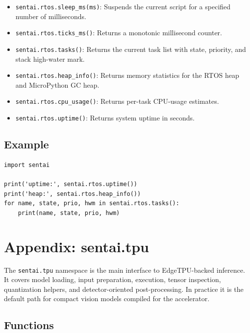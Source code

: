 \begin{itemize}
\tightlist
\item
  \texttt{sentai.rtos.sleep\_ms(ms)}: Suspends the current script for a
  specified number of milliseconds.
\item
  \texttt{sentai.rtos.ticks\_ms()}: Returns a monotonic millisecond
  counter.
\item
  \texttt{sentai.rtos.tasks()}: Returns the current task list with
  state, priority, and stack high-water mark.
\item
  \texttt{sentai.rtos.heap\_info()}: Returns memory statistics for the
  RTOS heap and MicroPython GC heap.
\item
  \texttt{sentai.rtos.cpu\_usage()}: Returns per-task CPU-usage
  estimates.
\item
  \texttt{sentai.rtos.uptime()}: Returns system uptime in seconds.
\end{itemize}

\subsection{Example}\label{example-1}

\begin{verbatim}
import sentai

print('uptime:', sentai.rtos.uptime())
print('heap:', sentai.rtos.heap_info())
for name, state, prio, hwm in sentai.rtos.tasks():
    print(name, state, prio, hwm)
\end{verbatim}

\section{Appendix: sentai.tpu}\label{appendix-sentai.tpu}

The \texttt{sentai.tpu} namespace is the main interface to
EdgeTPU-backed inference. It covers model loading, input preparation,
execution, tensor inspection, quantization helpers, and
detector-oriented post-processing. In practice it is the default path
for compact vision models compiled for the accelerator.

\subsection{Functions}\label{functions-2}

